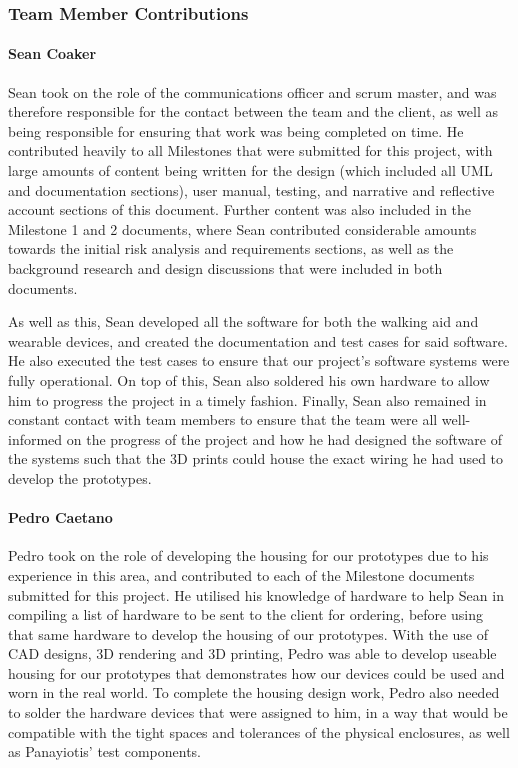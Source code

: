             \subsubsection{Team Member Contributions}

                \paragraph{Sean Coaker}\mbox{}

                Sean took on the role of the communications officer and scrum master, and was therefore responsible for the contact between the team and the client, as well as being responsible for ensuring that work was being completed on time. He contributed heavily to all Milestones that were submitted for this project, with large amounts of content being written for the design (which included all UML and documentation sections), user manual, testing, and narrative and reflective account sections of this document. Further content was also included in the Milestone 1 and 2 documents, where Sean contributed considerable amounts towards the initial risk analysis and requirements sections, as well as the background research and design discussions that were included in both documents.

                As well as this, Sean developed all the software for both the walking aid and wearable devices, and created the documentation and test cases for said software. He also executed the test cases to ensure that our project's software systems were fully operational. On top of this, Sean also soldered his own hardware to allow him to progress the project in a timely fashion. Finally, Sean also remained in constant contact with team members to ensure that the team were all well-informed on the progress of the project and how he had designed the software of the systems such that the 3D prints could house the exact wiring he had used to develop the prototypes.

                \paragraph{Pedro Caetano}\mbox{}

                Pedro took on the role of developing the housing for our prototypes due to his experience in this area, and contributed to each of the Milestone documents submitted for this project. He utilised his knowledge of hardware to help Sean in compiling a list of hardware to be sent to the client for ordering, before using that same hardware to develop the housing of our prototypes. With the use of CAD designs, 3D rendering and 3D printing, Pedro was able to develop useable housing for our prototypes that demonstrates how our devices could be used and worn in the real world. To complete the housing design work, Pedro also needed to solder the hardware devices that were assigned to him, in a way that would be compatible with the tight spaces and tolerances of the physical enclosures, as well as Panayiotis' test components.

